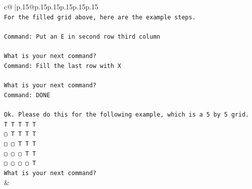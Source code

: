 \documentclass{article}
\begin{document}
{\begin{supertabular}{c@{$\;$}|p{.15\linewidth}@{}p{.15\linewidth}p{.15\linewidth}p{.15\linewidth}p{.15\linewidth}p{.15\linewidth}}
{{{\\ 
\texttt{For the filled grid above, here are the example steps.} \\
\\ 
\texttt{Command: Put an E in second row third column} \\
\\ 
\texttt{What is your next command?} \\
\texttt{Command: Fill the last row with X} \\
\\ 
\texttt{What is your next command?} \\
\texttt{Command: DONE} \\
\\ 
\texttt{Ok. Please do this for the following example, which is a 5 by 5 grid.} \\
\texttt{T T T T T} \\
\texttt{▢ T T T T} \\
\texttt{▢ ▢ T T T} \\
\texttt{▢ ▢ ▢ T T} \\
\texttt{▢ ▢ ▢ ▢ T} \\
\texttt{What is your next command?} \\
            }
        }
    }
    & \\ \\


\end{supertabular}}
\end{document}
